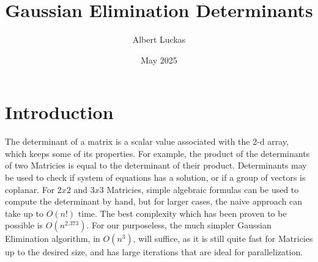 \documentclass{article}
\title{Gaussian Elimination Determinants}
\author{Albert Luckas}
\date{May 2025}
\begin{document}
\maketitle
\section{Introduction}
The determinant of a matrix is a scalar value associated with the 2-d array, which keeps some of its properties. For example, the product of the determinants of two Matricies is equal to the determinant of their product. Determinants may be used to check if  system of equations has a solution, or if a group of vectors is coplanar. For $2x2$ and $3x3$ Matricies, simple algebraic formulas can be used to compute the determinant by hand, but for larger cases, the naive approach can take up to $O(n!)$ time. The best complexity which has been proven to be possible is $O(n^{2.373})$. For our purposeless, the much simpler Gaussian Elimination algorithm, in $O(n^3)$, will suffice, as it is still quite fast for Matricies up to the desired size, and has large iterations that are ideal for parallelization.
\end{document}
